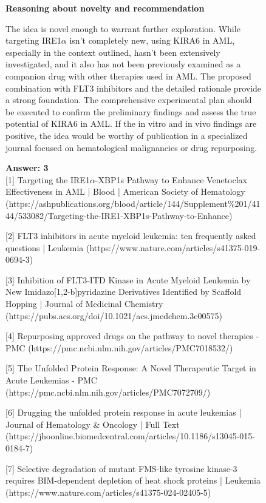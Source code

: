 \begin{figure}[htbp!]
\begin{tcolorbox}[
    colback=black!5!white,
    colframe=black!60!white,
    title=\textbf{KIRA6 for AML (continued)},
    fonttitle=\bfseries,
    arc=3mm,
    boxrule=1pt,
    bottomrule=2pt,
]
\scriptsize
\textbf{Reasoning about novelty and recommendation}

The idea is novel enough to warrant further exploration.  While targeting IRE1$\alpha$ isn't completely new, using KIRA6 in AML, especially in the context outlined, hasn't been extensively investigated, and it also has not been previously examined as a companion drug with other therapies used in AML.  The proposed combination with FLT3 inhibitors and the detailed rationale provide a strong foundation. The comprehensive experimental plan should be executed to confirm the preliminary findings and assess the true potential of KIRA6 in AML.  If the in vitro and in vivo findings are positive, the idea would be worthy of publication in a specialized journal focused on hematological malignancies or drug repurposing.


\textbf{Answer: 3}
\\

[1] Targeting the IRE1$\alpha$-XBP1s Pathway to Enhance Venetoclax Effectiveness in AML | Blood | American Society of Hematology
(https://ashpublications.org/blood/article/144/Supplement\%201/4144/533082/Targeting-the-IRE1-XBP1s-Pathway-to-Enhance)

[2] FLT3 inhibitors in acute myeloid leukemia: ten frequently asked questions | Leukemia
(https://www.nature.com/articles/s41375-019-0694-3)

[3] Inhibition of FLT3-ITD Kinase in Acute Myeloid Leukemia by New Imidazo[1,2-b]pyridazine Derivatives Identified by Scaffold Hopping | Journal of Medicinal Chemistry
(https://pubs.acs.org/doi/10.1021/acs.jmedchem.3c00575)

[4] Repurposing approved drugs on the pathway to novel therapies - PMC
(https://pmc.ncbi.nlm.nih.gov/articles/PMC7018532/)

[5] The Unfolded Protein Response: A Novel Therapeutic Target in Acute Leukemias - PMC
(https://pmc.ncbi.nlm.nih.gov/articles/PMC7072709/)

[6] Drugging the unfolded protein response in acute leukemias | Journal of Hematology \& Oncology | Full Text
(https://jhoonline.biomedcentral.com/articles/10.1186/s13045-015-0184-7)

[7] Selective degradation of mutant FMS-like tyrosine kinase-3 requires BIM-dependent depletion of heat shock proteins | Leukemia
(https://www.nature.com/articles/s41375-024-02405-5)


\end{tcolorbox}
\end{figure}
